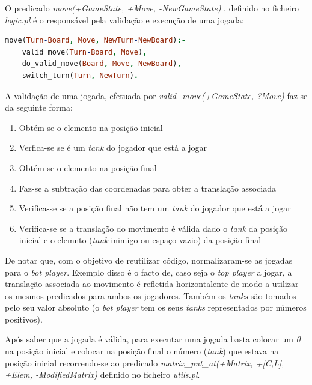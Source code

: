 \documentclass[a4paper,11pt,portuguese]{article}
\begin{document}
    O predicado \textit{move(+GameState, +Move, -NewGameState)} , definido no ficheiro
    \textit{logic.pl} é o responsável pela validação e execução de uma jogada:

\begin{lstlisting}[language=prolog]
% move(+GameState, +Move, -NewGameState)
move(Turn-Board, Move, NewTurn-NewBoard):-
    valid_move(Turn-Board, Move),
    do_valid_move(Board, Move, NewBoard),
    switch_turn(Turn, NewTurn).
\end{lstlisting}

    \noindent A validação de uma jogada, efetuada por
    \textit{valid\_move(+GameState, ?Move) } faz-se da seguinte forma:

    \begin{enumerate}[topsep=4pt,itemsep=2pt]
        \item Obtém-se o elemento na posição inicial
        \item Verfica-se se é um \textit{tank} do jogador que está a jogar
        \item Obtém-se o elemento na posição final
        \item Faz-se a subtração das coordenadas para obter a translação associada
        \item Verifica-se se a posição final não tem um \textit{tank} do jogador que
        está a jogar
        \item Verifica-se se a translação do movimento é válida dado o \textit{tank}
        da posição inicial e o elemnto (\textit{tank} inimigo ou espaço vazio) da posição final
    \end{enumerate}

    \noindent De notar que, com o objetivo de reutilizar código, normalizaram-se as jogadas
    para o \textit{bot player}. Exemplo disso é o facto de, caso seja o \textit{top player}
    a jogar, a translação associada ao movimento é refletida horizontalente de modo a utilizar
    os mesmos predicados para ambos os jogadores. Também os \textit{tanks} são tomados pelo seu
    valor absoluto (o \textit{bot player} tem os seus \textit{tanks} representados por números
    positivos).

    Após saber que a jogada é válida, para executar uma jogada basta colocar um \textit{0}
    na posição inicial e colocar na posição final o número (\textit{tank}) que estava na
    posição inicial recorrendo-se ao predicado
    \textit{matrix\_put\_at(+Matrix, +[C,L], +Elem, -ModifiedMatrix) } definido no ficheiro
    \textit{utils.pl}.
\end{document}
